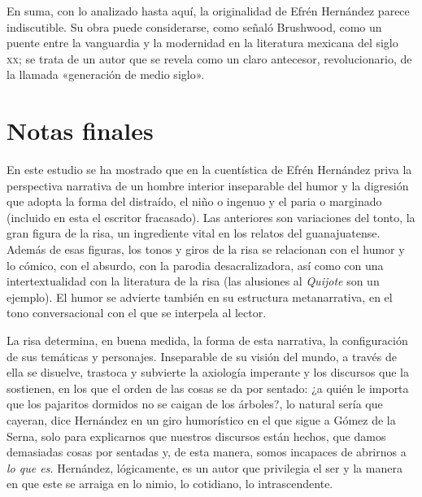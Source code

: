 \documentclass[14pt,twoside,final]{extbook} %
\begin{document}
En suma, con lo analizado hasta aquí, la originalidad de Efrén Hernández parece indiscutible. Su obra
puede considerarse, como señaló Brushwood, como un puente entre la vanguardia y la modernidad en la literatura mexicana del siglo \textsc{xx}; se trata de un autor que se revela como un claro antecesor, revolucionario, de la llamada «generación de medio siglo».
\chapter[\textsc{Notas finales}]{Notas finales}\label{ch:notas-finales}
\BgThispage
\thispagestyle{empty}
\pagestyle{fancy}
\fancyhf{} %
\fancyhead[RO,LE]{\thepage}
\renewcommand{\headrulewidth}{0pt}
En este estudio se ha mostrado que en la cuentística de Efrén Hernández priva la perspectiva narrativa de un hombre interior inseparable del humor y la digresión que adopta la forma del distraído, el niño o ingenuo y el paria o marginado (incluido en esta el escritor fracasado). Las anteriores son variaciones del tonto, la gran figura de la risa, un ingrediente vital en los relatos del guanajuatense. Además de esas figuras, los tonos y giros de la risa se relacionan con el humor y lo cómico, con el absurdo, con la parodia desacralizadora, así como con una intertextualidad con la literatura de la risa (las alusiones al \emph{Quijote} son un ejemplo). El humor se advierte también en su estructura metanarrativa, en el tono conversacional con el que se interpela al lector.

La risa determina, en buena medida, la forma de esta narrativa, la configuración de sus temáticas y personajes. Inseparable de su visión del mundo, a través de ella se disuelve, trastoca y subvierte la axiología imperante y los discursos que la sostienen, en los que el orden de las cosas se da por sentado: ¿a quién le importa que los pajaritos dormidos no se caigan de los árboles?, lo natural sería que cayeran, dice Hernández en un giro humorístico en el que sigue a Gómez de la Serna, solo para explicarnos que nuestros discursos están hechos, que damos demasiadas cosas por sentadas y, de esta manera, somos incapaces de abrirnos a \emph{lo que es.} Hernández, lógicamente, es un autor que privilegia el ser y la manera en que este se arraiga en lo nimio, lo cotidiano, lo intrascendente.
\end{document}
